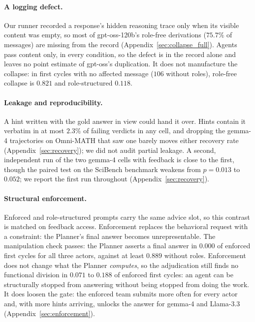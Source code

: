 \paragraph{A logging defect.} \label{subsec:logging} Our runner recorded
a response's hidden reasoning trace only when its visible content was
empty, so most of gpt-oss-120b's role-free derivations ($75.7\%$ of
messages) are missing from the record (Appendix~\ref{sec:collapse_full}). Agents pass content
only, in every condition, so the defect is in the record alone and leaves
no point estimate of gpt-oss's duplication. It does not manufacture the
collapse: in first cycles with no affected message ($106$ without roles),
role-free collapse is $0.821$ and role-structured $0.118$.



\paragraph{Leakage and reproducibility.} A hint written with the gold
answer in view could hand it over. Hints contain it verbatim in at most
$2.3\%$ of failing verdicts in any cell, and dropping the gemma-4
trajectories on Omni-MATH that saw one barely moves either recovery rate
(Appendix~\ref{sec:recovery}); we did not audit partial leakage. A second, independent run of the two gemma-4 cells with feedback
is close to the first, though the paired test on the SciBench benchmark
weakens from $p=0.013$ to $0.052$; we report the first run throughout
(Appendix~\ref{sec:recovery}).



\paragraph{Structural enforcement.} \label{app:enforce} Enforced and role-structured prompts carry the same advice slot, so this
contrast is matched on feedback access. Enforcement replaces the behavioral
request with a constraint: the Planner's final answer becomes
unrepresentable. The manipulation check passes: the Planner asserts a final
answer in $0.000$ of enforced first cycles for all three actors, against at
least $0.889$ without roles. Enforcement does not change what the Planner
\emph{computes}, so the adjudication still finds no functional division in
$0.071$ to $0.188$ of enforced first cycles: an agent can be structurally
stopped from answering without being stopped from doing the work. It does
loosen the gate: the enforced team submits more often for every actor and,
with more hints arriving, unlocks the answer for gemma-4 and Llama-3.3
(Appendix~\ref{sec:enforcement}).

